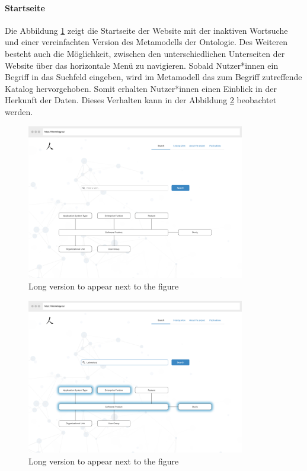 \paragraph{Startseite}

Die Abbildung \ref{fig:mockup_start1} zeigt die Startseite der Website mit der inaktiven Wortsuche und einer vereinfachten Version des Metamodells der Ontologie.
Des Weiteren besteht auch die Möglichkeit, zwischen den unterschiedlichen Unterseiten der Website über das horizontale Menü zu navigieren.
Sobald Nutzer*innen ein Begriff in das Suchfeld eingeben, wird im Metamodell das zum Begriff zutreffende Katalog hervorgehoben.
Somit erhalten Nutzer*innen einen Einblick in der Herkunft der Daten.
Dieses Verhalten kann in der Abbildung \ref{fig:mockup_start2} beobachtet werden.

\begin{figure}
	\centering
    	\includegraphics[width=0.85\textwidth]{Images/Mockup_Startseite_1}
   	\caption[Mockup -- Startseite]{Long version to appear next to the figure}
   	\label{fig:mockup_start1}
\end{figure}

\clearpage

\begin{figure}
	\centering
    	\includegraphics[width=0.85\textwidth]{Images/Mockup_Startseite_2}
   	\caption[Mockup -- Startseite mit aktiver Suche]{Long version to appear next to the figure}
   	\label{fig:mockup_start2}
\end{figure}

